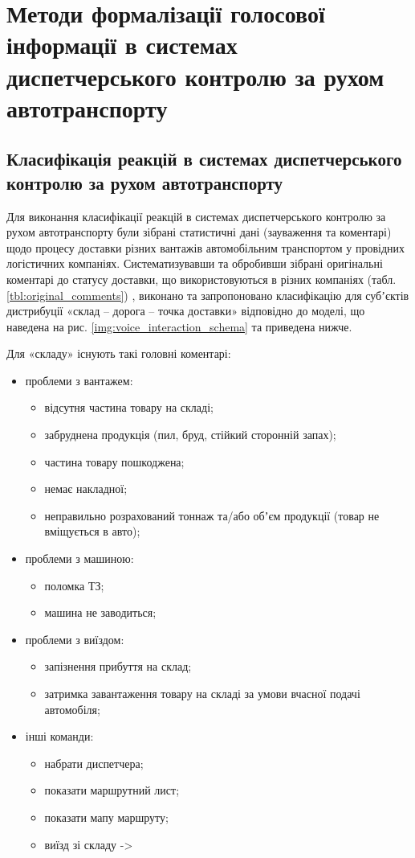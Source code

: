 \chapter{Методи формалізації голосової інформації в системах диспетчерського контролю за рухом автотранспорту} \label{chapt3}

\section{Класифікація реакцій в системах диспетчерського контролю за рухом автотранспорту} \label{sect3_1}

Для виконання класифікації реакцій в системах диспетчерського контролю за рухом автотранспорту були зібрані статистичні дані (зауваження та коментарі) щодо процесу доставки різних вантажів автомобільним транспортом у провідних логістичних компаніях. Систематизувавши та обробивши зібрані оригінальні коментарі до статусу доставки, що використовуються в різних компаніях (табл. \ref{tbl:original_comments}) , виконано та запропоновано класифікацію для субʼєктів дистрибуції «склад – дорога – точка доставки» відповідно до моделі, що наведена на рис. \ref{img:voice_interaction_schema} та приведена нижче.

Для «складу» існують такі головні коментарі:
\begin{itemize}
	\item проблеми з вантажем:
	\begin{itemize}
		\item відсутня частина товару на складі;
		\item забруднена продукція (пил, бруд, стійкий сторонній запах);
		\item частина товару пошкоджена;
		\item немає накладної;
		\item неправильно розрахований тоннаж та/або обʼєм продукції (товар не вміщується в авто);
	\end{itemize}
	\item проблеми з машиною:
	\begin{itemize}
		\item поломка ТЗ;
		\item машина не заводиться;
	\end{itemize}
	\item проблеми з виїздом:
	\begin{itemize}
		\item запізнення прибуття на склад;
		\item затримка завантаження товару на складі за умови вчасної подачі автомобіля;
	\end{itemize}
	\item інші команди:
	\begin{itemize}
		\item набрати диспетчера;
		\item показати маршрутний лист;
		\item показати мапу маршруту;
		\item виїзд зі складу ->
	\end{itemize}
\end{itemize}

